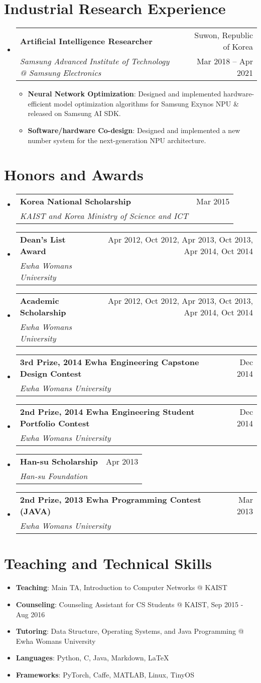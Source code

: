 \documentclass[letterpaper,oneside,11pt]{article}
\makeatletter
\newcommand{\resumeItem}[2]{
  \item\small{
    \textbf{#1}{: #2 \vspace{-2pt}}
  }
}
\newcommand{\resumeSubheading}[4]{
  \vspace{-2pt}\item
    \begin{tabularx}{0.97\textwidth}[t]{X@{\hspace{-5pt}}r}
      \textbf{#1} & #2 \\
      \textit{\small#3} & \small #4 \\
    \end{tabularx}\vspace{-6pt}
}
\newcommand{\awardsSubheading}[4]{
  \resumeSubheading{#1}{#2}{#3}{#4}\vspace{0pt}
}
\newcommand{\resumeSubHeadingListStart}{\begin{itemize}[leftmargin=*]}
\newcommand{\resumeSubHeadingListEnd}{\end{itemize}}
\newcommand{\resumeItemListStart}{\begin{itemize}}
\newcommand{\resumeItemListEnd}{\end{itemize}\vspace{-5pt}}
\makeatother
\begin{document}
\section{Industrial Research Experience}
\resumeSubHeadingListStart
    \resumeSubheading
      {Artificial Intelligence Researcher}{Suwon, Republic of Korea}
      {Samsung Advanced Institute of Technology @ Samsung Electronics}{Mar 2018 -- Apr 2021}
      \resumeItemListStart
        \resumeItem{Neural Network Optimization}{Designed and implemented hardware-efficient model optimization algorithms for Samsung Exynos NPU \& released on Samsung AI SDK.}
        \resumeItem{Software/hardware Co-design}{Designed and implemented a new number system for the next-generation NPU architecture.}
      \resumeItemListEnd
  \resumeSubHeadingListEnd

\section{Honors and Awards}
  \resumeSubHeadingListStart
    \awardsSubheading{Korea National Scholarship}{Mar 2015}
    {KAIST and Korea Ministry of Science and ICT}{}
    \awardsSubheading{Dean's List Award}{Apr 2012, Oct 2012, Apr 2013, Oct 2013, Apr 2014, Oct 2014}
    {Ewha Womans University}{}
    \awardsSubheading{Academic Scholarship}{Apr 2012, Oct 2012, Apr 2013, Oct 2013, Apr 2014, Oct 2014}
    {Ewha Womans University}{}
    \awardsSubheading{3rd Prize, 2014 Ewha Engineering Capstone Design Contest}{Dec 2014}
    {Ewha Womans University}{}
    \awardsSubheading{2nd Prize, 2014 Ewha Engineering Student Portfolio Contest}{Dec 2014}
    {Ewha Womans University}{}
    \awardsSubheading{Han-su Scholarship}{Apr 2013}
    {Han-su Foundation}{}
    \awardsSubheading{2nd Prize, 2013 Ewha Programming Contest (JAVA)}{Mar 2013}
    {Ewha Womans University}{}
  \resumeSubHeadingListEnd

%
\section{Teaching and Technical Skills}
 \resumeSubHeadingListStart
   \resumeItem{Teaching}{Main TA, Introduction to Computer Networks @ KAIST}
   \resumeItem{Counseling}{Counseling Assistant for CS Students @ KAIST, Sep 2015 - Aug 2016}
   \resumeItem{Tutoring}{Data Structure, Operating Systems, and Java Programming @ Ewha Womans University}
   \resumeItem{Languages}{Python, C, Java, Markdown, \LaTeX}
   \resumeItem{Frameworks}{PyTorch, Caffe, MATLAB, Linux, TinyOS}
 \resumeSubHeadingListEnd
\end{document}
